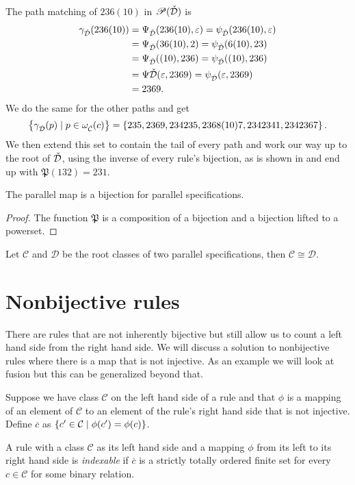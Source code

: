 The path matching of $236(10)$ in $\mathscr{P}(\check{\mathcal{D}})$ is
\begin{align*}
\gamma_{\check{\mathcal{D}}}(236(10)) &= \Psi_{\check{\mathcal{D}}}(236(10),\varepsilon) = \psi_{\check{\mathcal{D}}}(236(10), \varepsilon) \\
&= \Psi_{\check{\mathcal{D}}}(36(10),2) = \psi_{\check{\mathcal{D}}}(6(10),23) \\
&= \Psi_{\check{\mathcal{D}}}((10),236) = \psi_{\check{\mathcal{D}}}((10),236) \\
&= \Psi{\check{\mathcal{D}}}(\varepsilon, 2369) = \psi_{\check{\mathcal{D}}}(\varepsilon, 2369) \\
&= 2369.
\end{align*}
We do the same for the other paths and get
\[
    \left\{\gamma_{\check{\mathcal{D}}}(p) \mid p \in \omega_{\check{\mathcal{C}}}(c)\right\} = \left\{235, 2369, 234235,2368(10)7,2342341,2342367\right\}.
\]
We then extend this set to contain the tail of every path and work our way up to the root of $\check{\mathcal{D}}$, using the inverse of every rule's bijection, as is shown in  and end up with $\mathfrak{P}(132) = 231$.

\begin{proposition}
The parallel map is a bijection for parallel specifications.
\end{proposition}
\begin{proof}
The function $\mathfrak{P}$ is a composition of a bijection and a bijection lifted to a powerset.
\end{proof}
\begin{corollary}
Let $\mathcal{C}$ and $\mathcal{D}$ be the root classes of two parallel specifications, then $\mathcal{C} \cong \mathcal{D}$.
\end{corollary}

\section{Nonbijective rules}
There are rules that are not inherently bijective but still allow us to count a left hand side from the right hand side. We will discuss a solution to nonbijective rules where there is a map that is not injective. As an example we will look at fusion but this can be generalized beyond that.

Suppose we have class $\mathcal{C}$ on the left hand side of a rule and that $\phi$ is a mapping of an element of $\mathcal{C}$ to an element of the rule's right hand side that is not injective. Define $\overline{c}$ as $\left\{c' \in \mathcal{C} \mid \phi(c') = \phi(c)\right\}$. 

\begin{definition}
A rule with a class $\mathcal{C}$ as its left hand side and a mapping $\phi$ from its left to its right hand side is \emph{indexable} if $\overline{c}$ is a strictly totally ordered finite set for every $c \in \mathcal{C}$ for some binary relation.
\end{definition}

